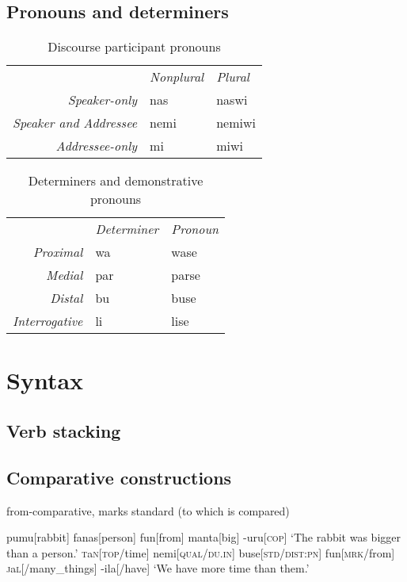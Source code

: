 \documentclass[a4paper,10pt,twoside,openright,draft]{memoir}
\begin{document}
\section{Pronouns and determiners}

\begin{table}[ht]
    \centering
    \begin{tabular}{rll}
        & \textit{Nonplural} & \textit{Plural} \\
    \textit{Speaker-only} & nas & naswi \\
    \textit{Speaker and Addressee} & nemi & nemiwi \\
    \textit{Addressee-only} & mi & miwi \\
    \end{tabular}
    \caption{Discourse participant pronouns}
    \label{tab:firstandsecond}
\end{table}

\begin{table}[ht]
    \centering
    \begin{tabular}{>{\em}rll}
        & \textit{Determiner} & \textit{Pronoun}  \\
    Proximal & wa & wase \\
    Medial & par & parse \\
    Distal & bu & buse \\
    Interrogative & li & lise \\
    \end{tabular}
    \caption{Determiners and demonstrative pronouns}
    \label{tab:determiners}
\end{table}

\chapter{Syntax}

\section{Verb stacking}

\section{Comparative constructions}

from-comparative, marks standard (to which is compared)

\pex[interpartskip=3ex]
\a
\begingl
pumu[rabbit]
fanas[person]
fun[from]
manta[big]
-uru[\textsc{cop}]
\glft `The rabbit was bigger than a person.'
\endgl
\a
\begingl
\textsc{t}a\textsc{n}[\textsc{top}/time]
nemi[\textsc{qual}/\textsc{du.in}]
buse[\textsc{std}/\textsc{dist:pn}]
fun[\textsc{mrk}/from]
\textsc{j}a\textsc{l}[/many\_things]
-ila[/have]
\glft `We have more time than them.'
\endgl
\xe
\end{document}
